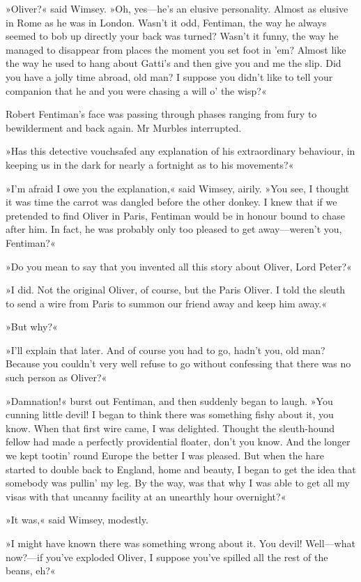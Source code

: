 »Oliver?« said Wimsey. »Oh, yes—he's an elusive personality. Almost as elusive in Rome as he was in London. Wasn't it odd, Fentiman, the way he always seemed to bob up directly your back was turned? Wasn't it funny, the way he managed to disappear from places the moment you set foot in 'em? Almost like the way he used to hang about Gatti's and then give you and me the slip. Did you have a jolly time abroad, old man? I suppose you didn't like to tell your companion that he and you were chasing a will o' the wisp?«

Robert Fentiman's face was passing through phases ranging from fury to bewilderment and back again. Mr Murbles interrupted.

»Has this detective vouchsafed any explanation of his extraordinary behaviour, in keeping us in the dark for nearly a fortnight as to his movements?«

»I'm afraid I owe you the explanation,« said Wimsey, airily. »You see, I thought it was time the carrot was dangled before the other donkey. I knew that if we pretended to find Oliver in Paris, Fentiman would be in honour bound to chase after him. In fact, he was probably only too pleased to get away—weren't you, Fentiman?«

»Do you mean to say that you invented all this story about Oliver, Lord Peter?«

»I did. Not the original Oliver, of course, but the Paris Oliver. I told the sleuth to send a wire from Paris to summon our friend away and keep him away.«

»But why?«

»I'll explain that later. And of course you had to go, hadn't you, old man? Because you couldn't very well refuse to go without confessing that there was no such person as Oliver?«

»Damnation!« burst out Fentiman, and then suddenly began to laugh. »You cunning little devil! I began to think there was something fishy about it, you know. When that first wire came, I was delighted. Thought the sleuth-hound fellow had made a perfectly providential floater, don't you know. And the longer we kept tootin' round Europe the better I was pleased. But when the hare started to double back to England, home and beauty, I began to get the idea that somebody was pullin' my leg. By the way, was that why I was able to get all my visas with that uncanny facility at an unearthly hour overnight?«

»It was,« said Wimsey, modestly.

»I might have known there was something wrong about it. You devil! Well—what now?—if you've exploded Oliver, I suppose you've spilled all the rest of the beans, eh?«

